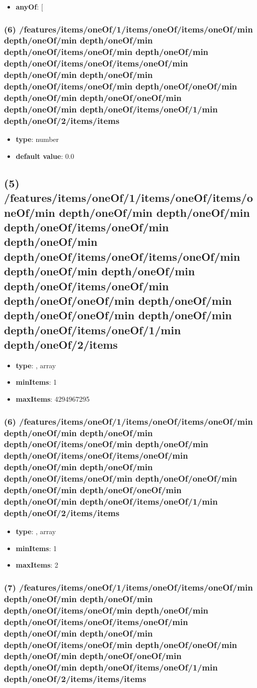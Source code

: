 \begin{itemize}[leftmargin=6em]\item {\bf anyOf}: [\end{itemize}\subsubsection{(6) /features/items/oneOf/1/items/oneOf/items/oneOf/min depth/oneOf/min depth/oneOf/min depth/oneOf/items/oneOf/min depth/oneOf/min depth/oneOf/items/oneOf/items/oneOf/min depth/oneOf/min depth/oneOf/min depth/oneOf/items/oneOf/min depth/oneOf/oneOf/min depth/oneOf/min depth/oneOf/oneOf/min depth/oneOf/min depth/oneOf/items/oneOf/1/min depth/oneOf/2/items/items}
\begin{itemize}[leftmargin=6em]\item {\bf type}: number\item {\bf default value}: 0.0
\end{itemize}\subsection{(5) /features/items/oneOf/1/items/oneOf/items/oneOf/min depth/oneOf/min depth/oneOf/min depth/oneOf/items/oneOf/min depth/oneOf/min depth/oneOf/items/oneOf/items/oneOf/min depth/oneOf/min depth/oneOf/min depth/oneOf/items/oneOf/min depth/oneOf/oneOf/min depth/oneOf/min depth/oneOf/oneOf/min depth/oneOf/min depth/oneOf/items/oneOf/1/min depth/oneOf/2/items}
\begin{itemize}[leftmargin=5em]\item {\bf type}: , array\item {\bf minItems}: 1
\item {\bf maxItems}: 4294967295
\end{itemize}\subsubsection{(6) /features/items/oneOf/1/items/oneOf/items/oneOf/min depth/oneOf/min depth/oneOf/min depth/oneOf/items/oneOf/min depth/oneOf/min depth/oneOf/items/oneOf/items/oneOf/min depth/oneOf/min depth/oneOf/min depth/oneOf/items/oneOf/min depth/oneOf/oneOf/min depth/oneOf/min depth/oneOf/oneOf/min depth/oneOf/min depth/oneOf/items/oneOf/1/min depth/oneOf/2/items/items}
\begin{itemize}[leftmargin=6em]\item {\bf type}: , array\item {\bf minItems}: 1
\item {\bf maxItems}: 2
\end{itemize}\subsubsection{(7) /features/items/oneOf/1/items/oneOf/items/oneOf/min depth/oneOf/min depth/oneOf/min depth/oneOf/items/oneOf/min depth/oneOf/min depth/oneOf/items/oneOf/items/oneOf/min depth/oneOf/min depth/oneOf/min depth/oneOf/items/oneOf/min depth/oneOf/oneOf/min depth/oneOf/min depth/oneOf/oneOf/min depth/oneOf/min depth/oneOf/items/oneOf/1/min depth/oneOf/2/items/items/items}
